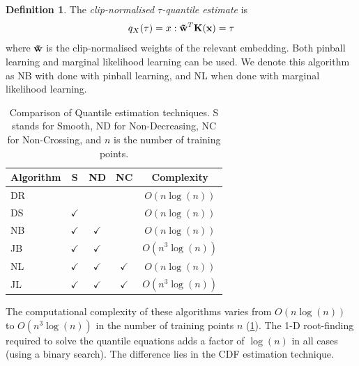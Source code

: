 \documentclass[twoside]{article} \usepackage{aistats2017}
\theoremstyle{definition}
\newtheorem{definition}{Definition}[section]
\theoremstyle{theorem}
\newcommand{\rv}[1]{{#1}}
\begin{document}
	\theoremstyle{definition}
	\begin{definition}
		The \textit{clip-normalised $\tau$-quantile estimate} is
		\begin{equation}
		q_{\rv{X}}(\tau) = x : \bvec{\tilde{w}}^{T} \bvec{K}(\bvec{x}) = \tau
		\end{equation}
		where $\mathbf{\tilde{w}}$ is the clip-normalised weights of the relevant embedding.
		Both pinball learning and marginal likelihood learning can be used. We denote this algorithm as NB with done with pinball learning, and NL when done with marginal likelihood learning.
	\end{definition}	
	
	\begin{table}[t!]
% 
% 
		\begin{center}
			\begin{tabular}{l|cccc}
				Algorithm & S & ND &   NC & Complexity \\ \hline
				DR  &              &                &                & $O(n \log(n))$    \\
				DS  & $\checkmark$ &                &                &
				$O(n \log(n))$  \\
				NB  & $\checkmark$ & $\checkmark$   &                &
				$O(n \log(n))$ \\
				JB  & $\checkmark$ & $\checkmark$   &                &
				$O(n^{3} \log(n))$ \\
				NL  & $\checkmark$ & $\checkmark$   & $\checkmark$   &
				$O(n \log(n))$ \\
				JL  & $\checkmark$ & $\checkmark$   & $\checkmark$   &   $O(n^{3} \log(n))$ 
			\end{tabular}
		\end{center}
		\caption{\small Comparison of Quantile estimation techniques. S stands for Smooth, ND for Non-Decreasing, NC for Non-Crossing, and $n$ is the number of training points.}
		\label{table:quantile_regression_methods}
	\end{table}
	
		
	The computational complexity of these algorithms varies from $O(n \log(n))$ to $O(n^{3} \log(n))$ in the number of training points $n$ (\cref{table:quantile_regression_methods}). The 1-D root-finding required to solve the quantile equations adds a factor of $\log(n)$ in all cases (using a binary search). The difference lies in the CDF estimation technique.
	
\end{document}
